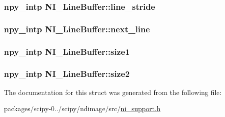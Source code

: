 \subsubsection[{line\+\_\+stride}]{\setlength{\rightskip}{0pt plus 5cm}npy\+\_\+intp N\+I\+\_\+\+Line\+Buffer\+::line\+\_\+stride}\label{structNI__LineBuffer_abf2d8d1e3cd1de9f2b10eee45e8494fc}
\hypertarget{structNI__LineBuffer_afc9d998ff01169b1830543a98d52a295}{}
\subsubsection[{next\+\_\+line}]{\setlength{\rightskip}{0pt plus 5cm}npy\+\_\+intp N\+I\+\_\+\+Line\+Buffer\+::next\+\_\+line}\label{structNI__LineBuffer_afc9d998ff01169b1830543a98d52a295}
\hypertarget{structNI__LineBuffer_a48f03039108dbcb38163cc54a5a22742}{}
\subsubsection[{size1}]{\setlength{\rightskip}{0pt plus 5cm}npy\+\_\+intp N\+I\+\_\+\+Line\+Buffer\+::size1}\label{structNI__LineBuffer_a48f03039108dbcb38163cc54a5a22742}
\hypertarget{structNI__LineBuffer_af76e9c1491086e07b62c48c6bbf1fa41}{}
\subsubsection[{size2}]{\setlength{\rightskip}{0pt plus 5cm}npy\+\_\+intp N\+I\+\_\+\+Line\+Buffer\+::size2}\label{structNI__LineBuffer_af76e9c1491086e07b62c48c6bbf1fa41}


The documentation for this struct was generated from the following file\+:\begin{DoxyCompactItemize}
\item 
packages/scipy-\/0../scipy/ndimage/src/\hyperlink{ni__support_8h}{ni\+\_\+support.\+h}\end{DoxyCompactItemize}
